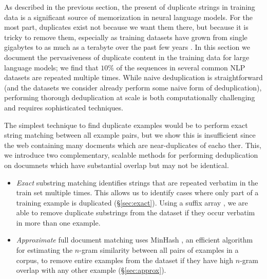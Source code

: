 As described in the previous section, the present of duplicate strings in training data is a significant source of memorization in neural language models.
For the most part, duplicates exist not because we want them there, but because it is tricky to remove them, especially as training datasets have grown from single gigabytes to as much as a terabyte over the past few years \citep{chelba2013one,xue2020mt5,graff2003english,brown2020language}.
In this section we document the pervasiveness of duplicate content in the training data for large language models; we find that $10\%$ of the sequences in several common NLP datasets are repeated multiple times.
While naive deduplication is straightforward
(and the datasets we consider already perform some naive form
of deduplication), performing thorough deduplication at scale is both computationally challenging and requires sophisticated techniques.




The simplest technique to find duplicate examples would be to perform exact string matching between all example pairs, but we show this is insufficient since the web containing many docments which are near-duplicates of eacho ther.
This, we introduce two complementary, scalable methods for performing deduplication on documnets which have substantial overlap but may not be identical.
\begin{itemize}
    \item
\textit{Exact} substring matching identifies strings that are repeated verbatim in the train set multiple times.
This allows us to identify cases where only part of a training example is duplicated (\S\ref{sec:exact}).
Using a suffix array \cite{manber1993suffix}, we are able to remove duplicate substrings from the dataset if they occur verbatim in more than one example.
    \item
\textit{Approximate} full document matching uses  MinHash \citep{broder1997resemblance}, an efficient algorithm for estimating the $n$-gram similarity between all pairs of examples in a corpus, to remove entire examples from the dataset if they have high $n$-gram overlap with any other example (\S\ref{sec:approx}).
\end{itemize}


